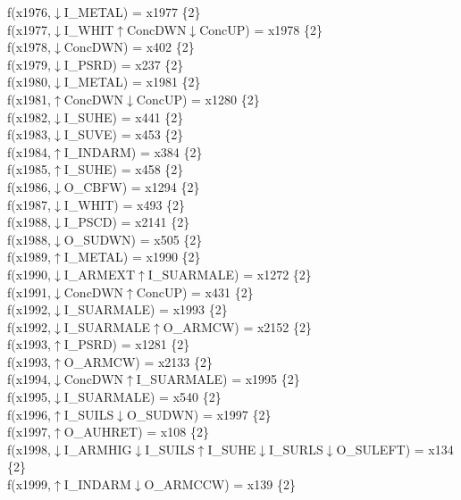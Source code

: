 f(x1976,$\downarrow$I\_METAL) = x1977 \{2\} \\  
f(x1977,$\downarrow$I\_WHIT$\uparrow$ConcDWN$\downarrow$ConcUP) = x1978 \{2\} \\  
f(x1978,$\downarrow$ConcDWN) = x402 \{2\} \\  
f(x1979,$\downarrow$I\_PSRD) = x237 \{2\} \\  
f(x1980,$\downarrow$I\_METAL) = x1981 \{2\} \\  
f(x1981,$\uparrow$ConcDWN$\downarrow$ConcUP) = x1280 \{2\} \\  
f(x1982,$\downarrow$I\_SUHE) = x441 \{2\} \\  
f(x1983,$\downarrow$I\_SUVE) = x453 \{2\} \\  
f(x1984,$\uparrow$I\_INDARM) = x384 \{2\} \\  
f(x1985,$\uparrow$I\_SUHE) = x458 \{2\} \\  
f(x1986,$\downarrow$O\_CBFW) = x1294 \{2\} \\  
f(x1987,$\downarrow$I\_WHIT) = x493 \{2\} \\  
f(x1988,$\downarrow$I\_PSCD) = x2141 \{2\} \\  
f(x1988,$\downarrow$O\_SUDWN) = x505 \{2\} \\  
f(x1989,$\uparrow$I\_METAL) = x1990 \{2\} \\  
f(x1990,$\downarrow$I\_ARMEXT$\uparrow$I\_SUARMALE) = x1272 \{2\} \\  
f(x1991,$\downarrow$ConcDWN$\uparrow$ConcUP) = x431 \{2\} \\  
f(x1992,$\downarrow$I\_SUARMALE) = x1993 \{2\} \\  
f(x1992,$\downarrow$I\_SUARMALE$\uparrow$O\_ARMCW) = x2152 \{2\} \\  
f(x1993,$\uparrow$I\_PSRD) = x1281 \{2\} \\  
f(x1993,$\uparrow$O\_ARMCW) = x2133 \{2\} \\  
f(x1994,$\downarrow$ConcDWN$\uparrow$I\_SUARMALE) = x1995 \{2\} \\  
f(x1995,$\downarrow$I\_SUARMALE) = x540 \{2\} \\  
f(x1996,$\uparrow$I\_SUILS$\downarrow$O\_SUDWN) = x1997 \{2\} \\  
f(x1997,$\uparrow$O\_AUHRET) = x108 \{2\} \\  
f(x1998,$\downarrow$I\_ARMHIG$\downarrow$I\_SUILS$\uparrow$I\_SUHE$\downarrow$I\_SURLS$\downarrow$O\_SULEFT) = x134 \{2\} \\  
f(x1999,$\uparrow$I\_INDARM$\downarrow$O\_ARMCCW) = x139 \{2\} \\  
